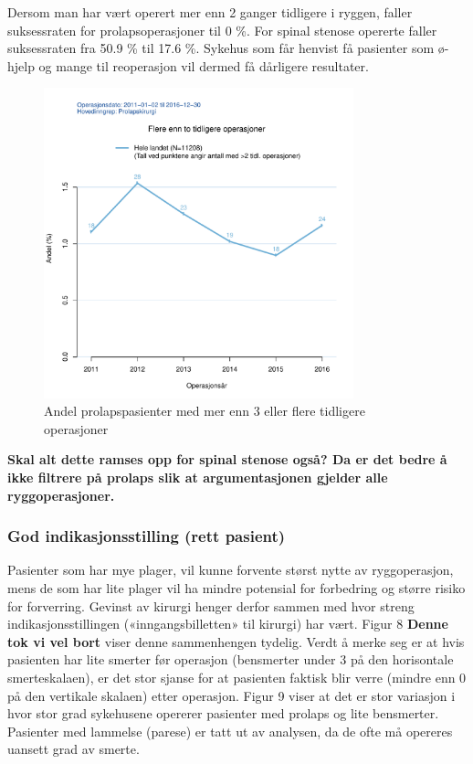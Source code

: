 \documentclass [norsk,a4paper,twoside]{article}\usepackage[]{graphicx}\usepackage[]{color}
\begin{document}
Dersom man har vært operert mer enn 2 ganger tidligere i
ryggen, faller suksessraten for prolapsoperasjoner til 0 \%. 
For spinal stenose opererte faller suksessraten fra 50.9 \% til 17.6 \%. 
Sykehus som får henvist få pasienter som ø-hjelp og
mange til reoperasjon vil dermed få dårligere resultater.


\begin{figure}[ht]
\centering \includegraphics[width= 0.8\textwidth]{FigTidlOpAnt3.pdf}
\caption{\label{fig:TidlOpAnt3} Andel prolapspasienter med mer enn 3 eller flere tidligere operasjoner}
\end{figure}

\textbf{Skal alt dette ramses opp for spinal stenose også? Da er det bedre å ikke filtrere på prolaps slik at argumentasjonen gjelder alle ryggoperasjoner.}


\subsubsection{God indikasjonsstilling (rett pasient)}



Pasienter som har mye plager, vil kunne forvente størst nytte av ryggoperasjon,
mens de som har lite plager vil ha mindre potensial for forbedring og større risiko
for forverring. Gevinst av kirurgi henger derfor sammen med hvor streng
indikasjonsstillingen («inngangsbilletten» til kirurgi) har vært. Figur 8 \textbf{Denne tok vi vel bort} viser denne
sammenhengen tydelig. Verdt å merke seg er at hvis pasienten har lite smerter før
operasjon (bensmerter under 3 på den horisontale smerteskalaen), er det stor
sjanse for at pasienten faktisk blir verre (mindre enn 0 på den vertikale skalaen) etter
operasjon. Figur 9 viser at det er stor variasjon i hvor stor grad sykehusene opererer
pasienter med prolaps og lite bensmerter. Pasienter med lammelse (parese) er tatt
ut av analysen, da de ofte må opereres uansett grad av smerte.
\end{document}
